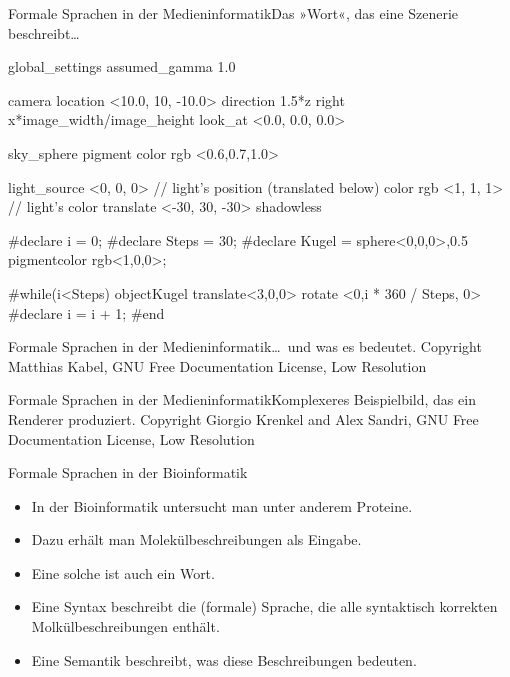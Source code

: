 \begin{frame}[fragile]{Formale Sprachen in der Medieninformatik}{Das
    »Wort«, das eine Szenerie beschreibt\dots}
\begin{verbatim*}
global_settings { assumed_gamma 1.0 }

camera {
  location  <10.0, 10, -10.0>
  direction 1.5*z
  right     x*image_width/image_height
  look_at   <0.0, 0.0,  0.0>
}

sky_sphere { pigment { color rgb <0.6,0.7,1.0> } }

light_source {
  <0, 0, 0>            // light's position (translated below)
  color rgb <1, 1, 1>  // light's color
  translate <-30, 30, -30>
  shadowless
}

#declare i = 0; 
#declare Steps = 30;
#declare Kugel = sphere{<0,0,0>,0.5 pigment{color rgb<1,0,0>}};

#while(i<Steps)
    object{Kugel  translate<3,0,0> rotate <0,i * 360 / Steps, 0> }
  #declare i = i + 1;
#end
\end{verbatim*}
\end{frame}


\begin{frame}{Formale Sprachen in der Medieninformatik}{\dots\ und was es bedeutet.}
  {Copyright Matthias Kabel, GNU Free Documentation License, Low Resolution}
\end{frame}

\begin{frame}{Formale Sprachen in der Medieninformatik}{Komplexeres Beispielbild, das ein Renderer produziert.}
  {Copyright Giorgio Krenkel and Alex Sandri, GNU Free Documentation License, Low Resolution}
\end{frame}


\begin{frame}{Formale Sprachen in der Bioinformatik}
  \begin{itemize}
  \item In der Bioinformatik untersucht man unter anderem Proteine.
  \item Dazu erhält man \alert{Molekülbeschreibungen} als Eingabe.
  \item Eine solche ist auch ein \alert{Wort}.
  \item Eine \alert{Syntax} beschreibt die (formale) Sprache, die alle
    \alert{syntaktisch korrekten Molkülbeschreibungen}  enthält.
  \item Eine \alert{Semantik} beschreibt, was diese Beschreibungen bedeuten.
  \end{itemize}
\end{frame}


